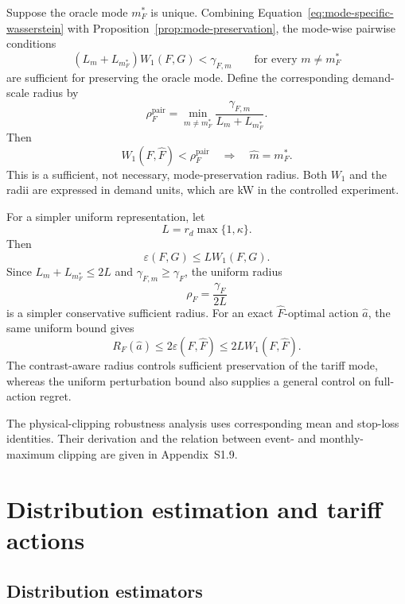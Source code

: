 \documentclass[Times1COL]{WileyNJDv5}
\begin{document}
Suppose the oracle mode $m_F^\ast$ is unique. Combining
Equation~\eqref{eq:mode-specific-wasserstein} with
Proposition~\ref{prop:mode-preservation}, the mode-wise pairwise
conditions
\[
(L_m+L_{m_F^\ast})W_1(F,G)<\gamma_{F,m}
\qquad\text{for every }m\neq m_F^\ast
\]
are sufficient for preserving the oracle mode. Define the corresponding
demand-scale radius by
\begin{equation}
\label{eq:pairwise-wasserstein-radius}
\rho_F^{\mathrm{pair}}
=
\min_{m\neq m_F^\ast}
\frac{\gamma_{F,m}}{L_m+L_{m_F^\ast}}.
\end{equation}
Then
\begin{equation}
\label{eq:pairwise-wasserstein-certificate}
W_1(F,\widehat F)<\rho_F^{\mathrm{pair}}
\quad\Longrightarrow\quad
\widehat m=m_F^\ast.
\end{equation}
This is a sufficient, not necessary, mode-preservation radius. Both
$W_1$ and the radii are expressed in demand units, which are kW in the
controlled experiment.

For a simpler uniform representation, let
\[
L=r_d\max\{1,\kappa\}.
\]
Then
\begin{equation}
\label{eq:uniform-wasserstein-perturbation}
\varepsilon(F,G)\leq L W_1(F,G).
\end{equation}
Since $L_m+L_{m_F^\ast}\leq2L$ and
$\gamma_{F,m}\geq\gamma_F$, the uniform radius
\begin{equation}
\label{eq:uniform-wasserstein-radius}
\rho_F=\frac{\gamma_F}{2L}
\end{equation}
is a simpler conservative sufficient radius. For an exact
$\widehat F$-optimal action $\widehat a$, the same uniform bound gives
\[
R_F(\widehat a)
\leq2\varepsilon(F,\widehat F)
\leq2L W_1(F,\widehat F).
\]
The contrast-aware radius controls sufficient preservation of the
tariff mode, whereas the uniform perturbation bound also supplies a
general control on full-action regret.

The physical-clipping robustness analysis uses corresponding mean and
stop-loss identities. Their derivation and the relation between event-
and monthly-maximum clipping are given in Appendix~S1.9.

\section{Distribution estimation and tariff actions}
\label{sec:distribution-estimation-actions}

\subsection{Distribution estimators}
\label{sec:distribution-estimators}
\end{document}

